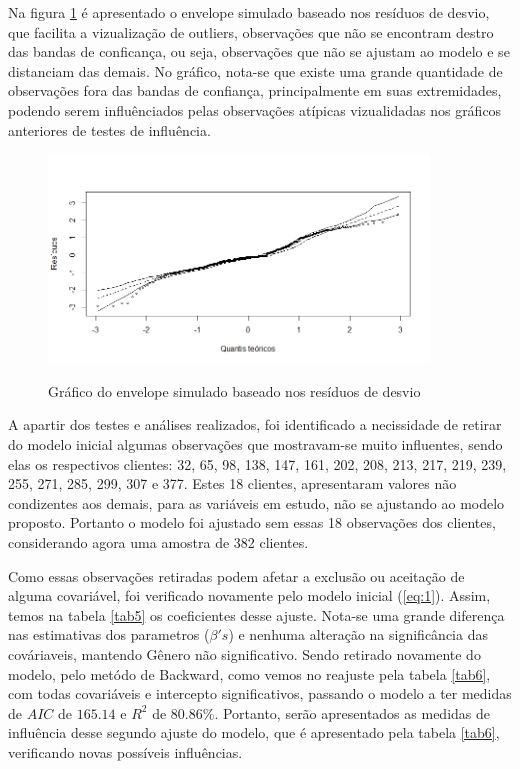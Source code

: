 \documentclass[a4paper]{article}
\begin{document}
Na figura \ref{fig:es1} é apresentado o envelope simulado baseado nos resíduos de desvio, que facilita a vizualização de outliers, observações que não se encontram destro das bandas de conficança, ou seja, observações que não se ajustam ao modelo e se distanciam das demais.  No gráfico, nota-se que existe uma grande quantidade de observações fora das bandas de confiança, principalmente em suas extremidades, podendo serem influênciados pelas observações atípicas vizualidadas nos gráficos anteriores de testes de influência.
\begin{figure}[H] 
    \centering %
    \caption{Gráfico do envelope simulado baseado nos resíduos de desvio}
    \includegraphics[width=0.9\textwidth]{imagens/ES1.png}
    \label{fig:es1}
\end{figure}
A apartir dos testes e análises realizados, foi identificado a necissidade de retirar do modelo inicial algumas observações que mostravam-se muito influentes, sendo elas os respectivos clientes: 32, 65, 98, 138, 147, 161, 202, 208, 213, 217, 219, 239, 255, 271, 285, 299, 307 e 377. Estes 18 clientes, apresentaram valores não condizentes aos demais, para as variáveis em estudo, não se ajustando ao modelo proposto. Portanto o modelo foi ajustado sem essas 18 observações dos clientes, considerando agora uma amostra de 382 clientes.

Como essas observações retiradas podem afetar a exclusão ou aceitação de alguma covariável, foi verificado novamente pelo modelo inicial (\ref{eq:1}). Assim, temos na tabela \ref{tab5} os coeficientes desse ajuste. Nota-se uma grande diferença nas estimativas dos parametros ($\beta's$) e nenhuma alteração na significância das cováriaveis, mantendo Gênero  não significativo. Sendo retirado novamente do modelo, pelo metódo de Backward, como vemos no reajuste pela tabela \ref{tab6}, com todas covariáveis e intercepto significativos, passando o modelo a ter medidas de $AIC$ de $165.14$ e $R^2$ de $80.86\%$. Portanto, serão apresentados as medidas de influência desse segundo ajuste do modelo, que é apresentado pela tabela \ref{tab6}, verificando novas possíveis influências.
\end{document}
